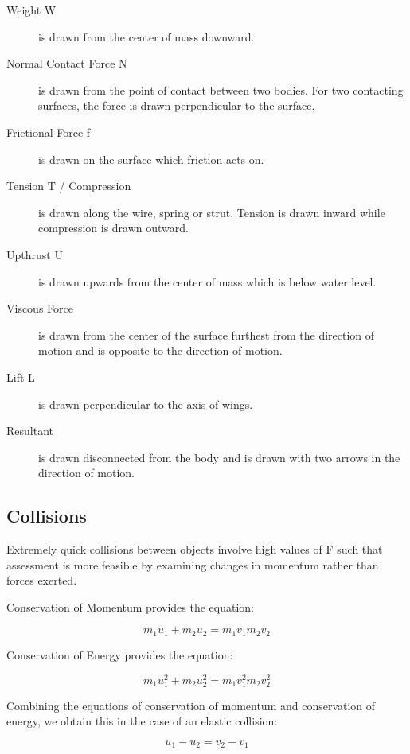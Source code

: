 \documentclass[../main]{subfiles}
\begin{document}
	\begin{description}
		\item[Weight W] is drawn from the center of mass downward.
		\item[Normal Contact Force N] is drawn from the point of contact between two bodies. For two contacting surfaces, the force is drawn perpendicular to the surface.
		\item[Frictional Force f] is drawn on the surface which friction acts on.
		\item[Tension T / Compression ] is drawn along the wire, spring or strut. Tension is drawn inward while compression is drawn outward.
		\item[Upthrust U] is drawn upwards from the center of mass which is below water level.
		\item[Viscous Force ] is drawn from the center of the surface furthest from the direction of motion and is opposite to the direction of motion.
		\item[Lift L] is drawn perpendicular to the axis of wings.
		\item[Resultant ] is drawn disconnected from the body and is drawn with two arrows in the direction of motion.
	\end{description}

	\subsection{Collisions}

	Extremely quick collisions between objects involve high values of F such that assessment is more feasible by examining changes in momentum rather than forces exerted.


	Conservation of Momentum provides the equation:

	\[ m_1u_1 + m_2u_2 = m_1v_1 m_2v_2 \]


	Conservation of Energy provides the equation:

	\[ m_1u_1^2 + m_2u_2^2 = m_1v_1^2 m_2v_2^2 \]


	Combining the equations of conservation of momentum and conservation of energy, we obtain this in the case of an elastic collision:

	\[ u_1 - u_2 = v_2 - v_1 \]

\end{document}
